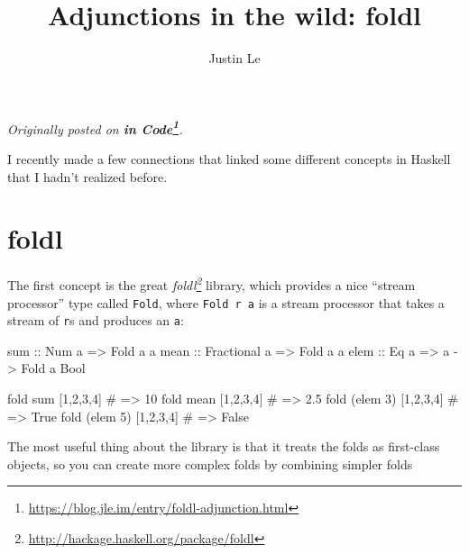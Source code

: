 \documentclass[]{article}
\title{Adjunctions in the wild: foldl}
\author{Justin Le}
\newenvironment{Shaded}{}{}
\newcommand{\DataTypeTok}[1]{\textcolor[rgb]{0.56,0.13,0.00}{#1}}
\newcommand{\DecValTok}[1]{\textcolor[rgb]{0.25,0.63,0.44}{#1}}
\newcommand{\FunctionTok}[1]{\textcolor[rgb]{0.02,0.16,0.49}{#1}}
\newcommand{\NormalTok}[1]{#1}
\newcommand{\OtherTok}[1]{\textcolor[rgb]{0.00,0.44,0.13}{#1}}
\newcommand{\PreprocessorTok}[1]{\textcolor[rgb]{0.74,0.48,0.00}{#1}}
\renewcommand{\href}[2]{#2\footnote{\url{#1}}}
\begin{document}
\maketitle

\emph{Originally posted on
\textbf{\href{https://blog.jle.im/entry/foldl-adjunction.html}{in Code}}.}

I recently made a few connections that linked some different concepts in Haskell
that I hadn't realized before.

\hypertarget{foldl}{%
\section{foldl}\label{foldl}}

The first concept is the great
\emph{\href{http://hackage.haskell.org/package/foldl}{foldl}} library, which
provides a nice ``stream processor'' type called \texttt{Fold}, where
\texttt{Fold\ r\ a} is a stream processor that takes a stream of \texttt{r}s and
produces an \texttt{a}:

\begin{Shaded}
\begin{Highlighting}[]
\FunctionTok{sum}\OtherTok{  ::} \DataTypeTok{Num}\NormalTok{ a        }\OtherTok{=>} \DataTypeTok{Fold}\NormalTok{ a a}
\OtherTok{mean ::} \DataTypeTok{Fractional}\NormalTok{ a }\OtherTok{=>} \DataTypeTok{Fold}\NormalTok{ a a}
\FunctionTok{elem}\OtherTok{ ::} \DataTypeTok{Eq}\NormalTok{ a         }\OtherTok{=>}\NormalTok{ a }\OtherTok{{-}>} \DataTypeTok{Fold}\NormalTok{ a }\DataTypeTok{Bool}

\NormalTok{fold }\FunctionTok{sum}\NormalTok{  [}\DecValTok{1}\NormalTok{,}\DecValTok{2}\NormalTok{,}\DecValTok{3}\NormalTok{,}\DecValTok{4}\NormalTok{]}
\PreprocessorTok{\#   => 10}
\NormalTok{fold mean [}\DecValTok{1}\NormalTok{,}\DecValTok{2}\NormalTok{,}\DecValTok{3}\NormalTok{,}\DecValTok{4}\NormalTok{]}
\PreprocessorTok{\#   => 2.5}
\NormalTok{fold (}\FunctionTok{elem} \DecValTok{3}\NormalTok{) [}\DecValTok{1}\NormalTok{,}\DecValTok{2}\NormalTok{,}\DecValTok{3}\NormalTok{,}\DecValTok{4}\NormalTok{]}
\PreprocessorTok{\#   => True}
\NormalTok{fold (}\FunctionTok{elem} \DecValTok{5}\NormalTok{) [}\DecValTok{1}\NormalTok{,}\DecValTok{2}\NormalTok{,}\DecValTok{3}\NormalTok{,}\DecValTok{4}\NormalTok{]}
\PreprocessorTok{\#   => False}
\end{Highlighting}
\end{Shaded}

The most useful thing about the library is that it treats the folds as
first-class objects, so you can create more complex folds by combining simpler
folds
\end{document}
